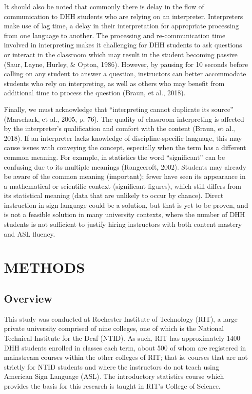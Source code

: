 \documentclass[11.5pt]{sig-alternate} %
\begin{document}
\begin{large}
It should also be noted that commonly there is delay in the flow of communication to DHH students who are relying on an interpreter. Interpreters make use of lag time, a delay in their interpretation for appropriate processing from one language to another. The processing and re-communication time involved in interpreting makes it challenging for DHH students to ask questions or interact in the classroom which may result in the student becoming passive (Saur, Layne, Hurley, \& Opton, 1986). However, by pausing for 10 seconds before calling on any student to answer a question, instructors can better accommodate students who rely on interpreting, as well as others who may benefit from additional time to process the question (Braun, et al., 2018). 

Finally, we must acknowledge that “interpreting cannot duplicate its source” (Marschark, et al., 2005, p. 76). The quality of classroom interpreting is affected by the interpreter’s qualification and comfort with the content (Braun, et al., 2018). If an interpreter lacks knowledge of discipline-specific language, this may cause issues with conveying the concept, especially when the term has a different common meaning. For example, in statistics the word “significant” can be confusing due to its multiple meanings (Rangecroft, 2002). Students may already be aware of the common meaning (important); fewer have seen its appearance in a mathematical or scientific context (significant figures), which still differs from its statistical meaning (data that are unlikely to occur by chance). Direct instruction in sign language could be a solution, but that is yet to be proven, and is not a feasible solution in many university contexts, where the number of DHH students is not sufficient to justify hiring instructors with both content mastery and ASL fluency.

\section*{METHODS}

\subsection*{Overview}

This study was conducted at Rochester Institute of Technology (RIT), a large private university comprised of nine colleges, one of which is the National Technical Institute for the Deaf (NTID). As such, RIT has approximately 1400 DHH students enrolled in classes each term, about 500 of whom are registered in mainstream courses within the other colleges of RIT; that is, courses that are not strictly for NTID students and where the instructors do not teach using American Sign Language (ASL). The introductory statistics course which provides the basis for this research is taught in RIT’s College of Science.


\end{large}
\end{document}
